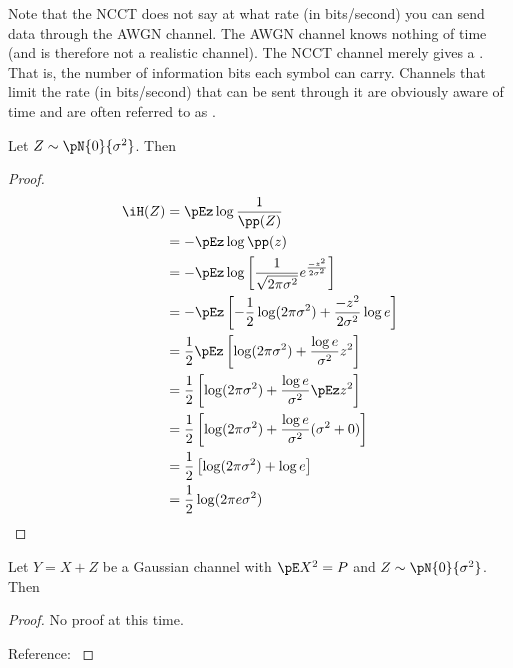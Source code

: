 Note that the NCCT does not say at what rate
(in bits/second) you can send data through the AWGN channel.
The AWGN channel knows nothing of time (and is therefore not a
realistic channel).
The NCCT channel merely gives a .
That is, the number of information bits each symbol can carry.
Channels that limit the rate (in bits/second) that can be sent through
it are obviously aware of time and are often referred to as
.

\begin{theorem}
Let $Z\sim\pN{0}{\sigma^2}$. Then
\end{theorem}
\begin{proof}
\begin{align*}
  \iH(Z)
    &= \pEz \log \frac{1}{\pp(Z)}
  \\&= -\pEz \log \pp(z)
  \\&= -\pEz
         \log \left[\frac{1}{\sqrt{2\pi\sigma^2}}e^{\frac{-z^2}{2\sigma^2}} \right]
  \\&= -\pEz \left[
        -\frac{1}{2}\log(2\pi\sigma^2)
        + \frac{-z^2}{2\sigma^2} \log e
        \right]
  \\&= \frac{1}{2} \pEz \left[
        \log(2\pi\sigma^2)
        + \frac{\log e}{\sigma^2}z^2
        \right]
  \\&= \frac{1}{2} \left[
        \log(2\pi\sigma^2) + \frac{\log e}{\sigma^2}\pEz z^2
        \right]
  \\&= \frac{1}{2} \left[
        \log(2\pi\sigma^2) + \frac{\log e}{\sigma^2}(\sigma^2+0)
        \right]
  \\&= \frac{1}{2} \left[
        \log(2\pi\sigma^2) + \log e
        \right]
  \\&= \frac{1}{2} \log(2\pi e\sigma^2)
\end{align*}
\end{proof}

\begin{theorem}
Let $Y=X+Z$ be a Gaussian channel with $\pE X^2=P$ and
$Z\sim\pN{0}{\sigma^2}$. Then
\end{theorem}
\begin{proof}
No proof at this time. \attention

Reference: \cite[page 241]{cover}
\end{proof}

